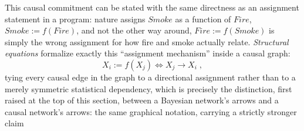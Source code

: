 This causal commitment can be stated with the same directness as an
assignment statement in a program: nature assigns $Smoke$ as a function of
$Fire$, $Smoke := f(Fire)$, and not the other way around, $Fire := f(Smoke)$
is simply the wrong assignment for how fire and smoke actually relate.
\emph{Structural equations} formalize exactly this ``assignment
mechanism'' inside a causal graph:
\begin{equation}
  \label{eq:causal-assignment-mechanism}
  X_i := f(X_j) \iff X_j \to X_i\;,
\end{equation}
tying every causal edge in the graph to a directional assignment rather
than to a merely symmetric statistical dependency, which is precisely the
distinction, first raised at the top of this section, between a Bayesian
network's arrows and a causal network's arrows: the same graphical
notation, carrying a strictly stronger claim
